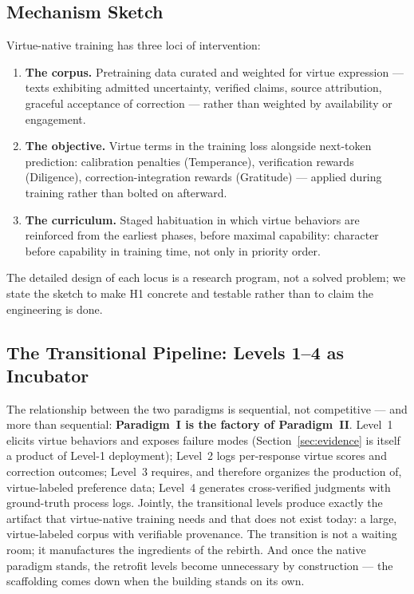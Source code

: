 \documentclass[11pt]{article}
\begin{document}
\subsection{Mechanism Sketch}

Virtue-native training has three loci of intervention:

\begin{enumerate}
  \item \textbf{The corpus.} Pretraining data curated and weighted for virtue expression --- texts exhibiting admitted uncertainty, verified claims, source attribution, graceful acceptance of correction --- rather than weighted by availability or engagement.
  \item \textbf{The objective.} Virtue terms in the training loss alongside next-token prediction: calibration penalties (Temperance), verification rewards (Diligence), correction-integration rewards (Gratitude) --- applied during training rather than bolted on afterward.
  \item \textbf{The curriculum.} Staged habituation in which virtue behaviors are reinforced from the earliest phases, before maximal capability: character before capability in training time, not only in priority order.
\end{enumerate}

The detailed design of each locus is a research program, not a solved problem; we state the sketch to make H1 concrete and testable rather than to claim the engineering is done.

\subsection{The Transitional Pipeline: Levels 1--4 as Incubator}
\label{sec:pipeline}

The relationship between the two paradigms is sequential, not competitive --- and more than sequential: \textbf{Paradigm~I is the factory of Paradigm~II}. Level~1 elicits virtue behaviors and exposes failure modes (Section~\ref{sec:evidence} is itself a product of Level-1 deployment); Level~2 logs per-response virtue scores and correction outcomes; Level~3 requires, and therefore organizes the production of, virtue-labeled preference data; Level~4 generates cross-verified judgments with ground-truth process logs. Jointly, the transitional levels produce exactly the artifact that virtue-native training needs and that does not exist today: a large, virtue-labeled corpus with verifiable provenance. The transition is not a waiting room; it manufactures the ingredients of the rebirth. And once the native paradigm stands, the retrofit levels become unnecessary by construction --- the scaffolding comes down when the building stands on its own.
\end{document}
